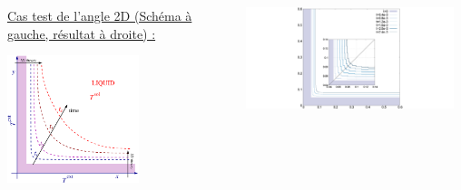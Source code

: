 \documentclass{beamer}
\begin{document}
\begin{frame}
\begin{center}
\begin{table}
\end{table}
\end{center}
\begin{columns}[t]
	\begin{column}{0.4\textwidth}
    \color{cea_rouge}\underline{Cas test de l'angle 2D (Schéma à gauche, résultat à droite) :}\color{cea_texte}
\begin{center}
        \includegraphics[width=0.60\textwidth]{Figures/2DStefan.pdf}
        \end{center}
        \end{column}
		\begin{column}{0.6\textwidth}
		\begin{center}
        \includegraphics[width=0.95\textwidth]{Figures/Angle2D2_2.pdf}
        \end{center}
        \end{column}
        \end{columns}


\end{frame}
\end{document}
